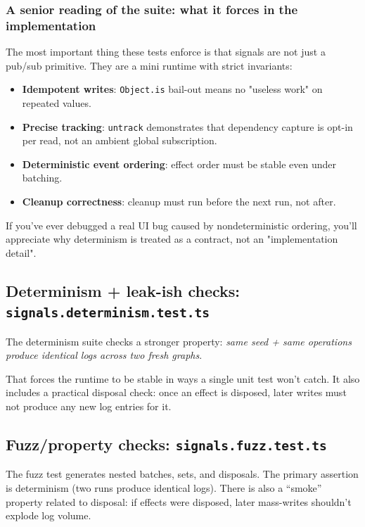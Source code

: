 \subsubsection{A senior reading of the suite: what it forces in the implementation}

The most important thing these tests enforce is that signals are not just a pub/sub primitive.
They are a mini runtime with strict invariants:

\begin{itemize}
  \item \textbf{Idempotent writes}: \texttt{Object.is} bail-out means no "useless work" on repeated values.
  \item \textbf{Precise tracking}: \texttt{untrack} demonstrates that dependency capture is opt-in per read, not an ambient global subscription.
  \item \textbf{Deterministic event ordering}: effect order must be stable even under batching.
  \item \textbf{Cleanup correctness}: cleanup must run before the next run, not after.
\end{itemize}

If you've ever debugged a real UI bug caused by nondeterministic ordering, you'll appreciate why determinism is treated as a contract, not an "implementation detail".

\subsection{Determinism + leak-ish checks: \texttt{signals.determinism.test.ts}}

The determinism suite checks a stronger property:
\emph{same seed + same operations produce identical logs across two fresh graphs}.

That forces the runtime to be stable in ways a single unit test won’t catch.
It also includes a practical disposal check: once an effect is disposed, later writes must not produce any new log entries for it.

\subsection{Fuzz/property checks: \texttt{signals.fuzz.test.ts}}

The fuzz test generates nested batches, sets, and disposals.
The primary assertion is determinism (two runs produce identical logs).
There is also a “smoke” property related to disposal: if effects were disposed, later mass-writes shouldn’t explode log volume.

